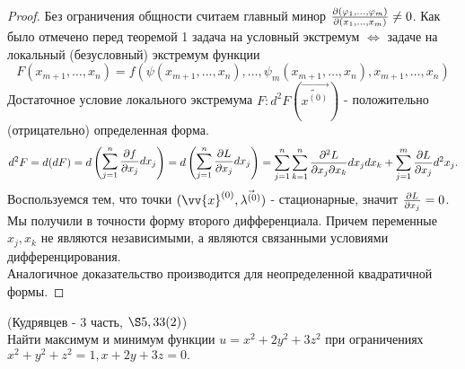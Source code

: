 \begin{proof}
    Без ограничения общности считаем главный минор $\frac{\partial (\varphi_1, \dots, \varphi_m)}{\partial (x_1, \dots, x_m)} \neq 0$. Как было отмечено перед теоремой 1 задача на условный экстремум $\Leftrightarrow$ задаче на локальный (безусловный) экстремум функции 
    \[
        F (x_{m+1}, \dots, x_n) = f(\psi(x_{m+1}, \dots, x_n), \dots, \psi_m(x_{m+1}, \dots, x_n), x_{m+1}, \dots, x_n)
    \]
    Достаточное условие локального экстремума $F\colon d^2F(\vec{\tilde{x^{(0)}}})$ - положительно (отрицательно) определенная форма.\\
    \[
        d^2F = d(d F) = d \left ( \begin{aligned} \sum^n_{j=1} \frac{\partial f}{\partial x_j} d x_j \end{aligned}  \right ) = d \left ( \begin{aligned} \sum^n_{j = 1} \frac{\partial L}{\partial x_j} d x_j \end{aligned}  \right ) = \sum^n_{j=1} \sum^n_{k=1} \frac{\partial^2 L}{\partial x_j \partial x_k} d x_j d x_k + \sum^m_{j=1} \frac{\partial L}{\partial x_j} d^2 x_j.
    \]
    Воспользуемся тем, что точки $(\vv{x}^{(0)}, \vec{\lambda^{(0)}})$ - стационарные, значит $\frac{\partial L}{\partial x_j} = 0$. Мы получили в точности форму второго дифференциала. Причем переменные $x_j, x_k$ не являются независимыми, а являются связанными условиями дифференцирования. \\
    Аналогичное доказательство производится для неопределенной квадратичной формы.
\end{proof}

\begin{example} (Кудрявцев - 3 часть, $\S 5, 33(2)$) \\
    Найти максимум и минимум функции $u = x^2 + 2y^2+3z^2$ при ограничениях $x^2+y^2+z^2=1, x+2y+3z=0.$
\end{example}

